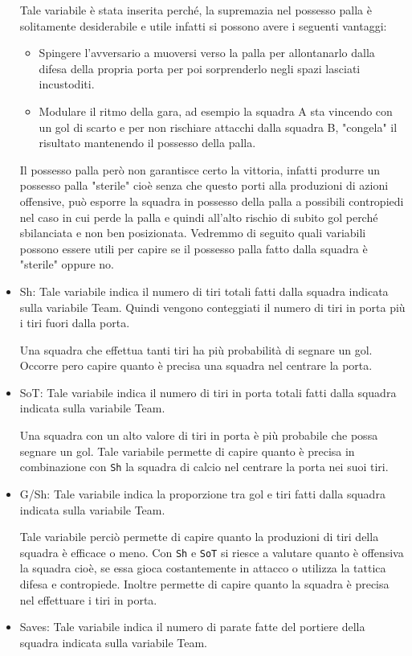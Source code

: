 \begin{itemize}
	Tale variabile è stata inserita perché, la supremazia nel possesso palla è solitamente desiderabile e utile infatti si possono avere i seguenti vantaggi:
	\begin{itemize}
		\item Spingere l’avversario a muoversi verso la palla per allontanarlo dalla difesa della propria porta per poi sorprenderlo negli spazi lasciati incustoditi.   
		\item Modulare il ritmo della gara, ad esempio la squadra A sta vincendo con un gol di scarto e per non rischiare attacchi dalla squadra B, "congela" il risultato mantenendo il possesso della palla.
	\end{itemize}
	Il possesso palla però non garantisce certo la vittoria, infatti produrre un possesso palla "sterile" cioè senza che questo porti alla produzioni di azioni offensive, può esporre la squadra in possesso della palla a possibili contropiedi nel caso in cui perde la palla e quindi all'alto rischio di subito gol perché sbilanciata e non ben posizionata. Vedremmo di seguito quali variabili possono essere utili per capire se il possesso palla fatto dalla squadra è "sterile" oppure no.

	\item \textsf{Sh}: Tale variabile indica il numero di tiri totali fatti dalla squadra indicata sulla variabile \textsf{Team}. Quindi vengono conteggiati il numero di tiri in porta più i tiri fuori dalla porta. 
	
	Una squadra che effettua tanti tiri ha più probabilità di segnare un gol. Occorre pero capire quanto è precisa una squadra nel centrare la porta.
	\item \textsf{SoT}: Tale variabile indica il numero di tiri in porta totali fatti dalla squadra indicata sulla variabile \textsf{Team}. 
	
	Una squadra con un alto valore di tiri in porta è più probabile che possa segnare un gol. Tale variabile permette di capire quanto è precisa in combinazione con \texttt{Sh} la squadra di calcio nel centrare la porta nei suoi tiri.
	\item \textsf{G/Sh}: Tale variabile indica la proporzione tra gol e tiri fatti dalla squadra indicata sulla variabile \textsf{Team}. 
	
	Tale variabile perciò permette di capire quanto la produzioni di tiri della squadra è efficace o meno. Con \texttt{Sh} e \texttt{SoT} si riesce a valutare quanto è offensiva la squadra cioè, se essa gioca costantemente in attacco o utilizza la tattica difesa e contropiede. Inoltre permette di capire quanto la squadra è precisa nel effettuare i tiri in porta.
	\item \textsf{Saves}: Tale variabile indica il numero di parate fatte del portiere della squadra indicata sulla variabile \textsf{Team}. 
	

\end{itemize}
